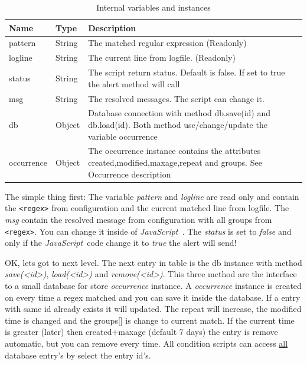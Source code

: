 \documentclass[11pt,a4paper]{article}
\newcommand{\js}{\textit{JavaScript\ }}
\begin{document}
\begin{table}[ht]
\begin{tabular}{l|l|p{}}

  Name & Type & Description\\\hline\hline

  pattern & String &
  The matched regular expression (Readonly) \\\hline

  logline & String &
  The current line from logfile. (Readonly)\\\hline

  status & String &
  The script return status. Default is false. If set to true
  the alert method will call\\\hline

  msg & 	String &
  The resolved messages. The script can change it.\\\hline

  db & Object &
  Database connection with method db.save(id) and db.load(id).
  Both method use/change/update the  variable occurrence\\\hline

  occurrence & 	Object &
  The occurrence instance contains the attributes
  created,modified,maxage,repeat and groups. See Occurrence description\\\hline

\end{tabular}
\label{tab:vars}
\caption{Internal variables and instances}
\end{table}

The simple thing first: The variable \textit{pattern} and \textit{logline}
are read only and contain the \verb#<regex># from configuration and the
current matched line from logfile. The \textit{msg} contain the resolved
message from configuration with all groups from \verb#<regex>#. You
can change it inside of \js. The \textit{status} is set to \textit{false}
and only if the \js code change it to \textit{true} the alert will send!

OK, lets got to next level. The next entry in table is the db instance
with method \textit{save(\textless{}id\textgreater{})}, \textit{load(\textless{}id\textgreater{})}
and \textit{remove(\textless{}id\textgreater{})}. This three method are the interface to
a small database for store \textit{occurrence} instance. A \textit{occurrence} instance is created
on every time a regex matched and you can save it inside the database. If a entry with same
 id already exists it will updated. The repeat will increase, the modified time is changed and
 the groups[] is change to current match. If the current time is greater (later) then
 created+maxage (default 7 days) the entry is remove automatic, but you can remove every time.
 All condition scripts can access \underline{all} database entry's by select the
 entry id's.
\end{document}
